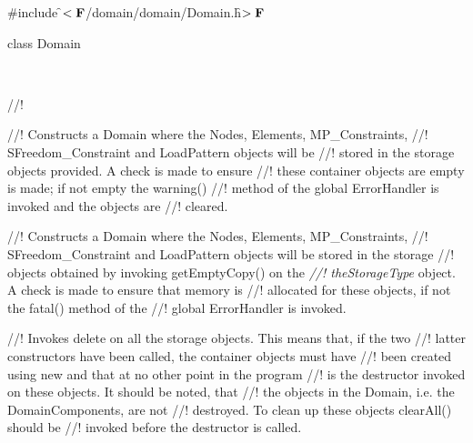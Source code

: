 
\indent \#include \f$<{\bf F}$/domain/domain/Domain.h\f$>{\bf F}$  

\indent class Domain  



\   

//!    


//! Constructs a Domain where the Nodes, Elements, MP\_Constraints,
//! SFreedom\_Constraint and LoadPattern objects will be
//! stored in the storage objects provided. A check is made to ensure
//! these container objects are empty is made; if not empty the warning()
//! method of the global ErrorHandler is invoked and the objects are
//! cleared. 

//! Constructs a Domain where the Nodes, Elements, MP\_Constraints,
//! SFreedom\_Constraint and LoadPattern objects will be stored in the storage
//! objects obtained by invoking getEmptyCopy() on the {\em
//! theStorageType} object. A check is made to ensure that memory is
//! allocated for these objects, if not the fatal() method of the
//! global ErrorHandler is invoked.    

//! Invokes delete on all the storage objects. This means that, if the two
//! latter constructors have been called, the container objects must have 
//! been created using \p new and that at no other point in the program
//! is the destructor invoked on these objects. It should be noted, that
//! the objects in the Domain, i.e. the DomainComponents, are not
//! destroyed. To clean up these objects clearAll() should be
//! invoked before the destructor is called. 


